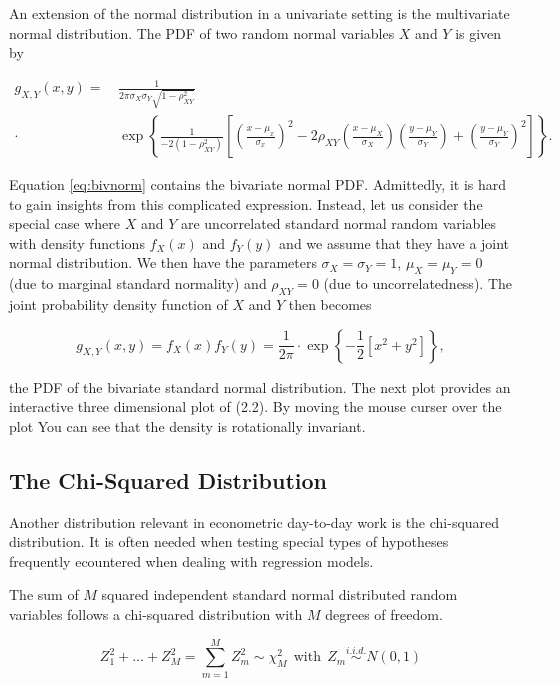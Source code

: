 \documentclass[]{book}
\theoremstyle{definition}
\theoremstyle{definition}
\theoremstyle{definition}
\theoremstyle{remark}
\begin{document}
An extension of the normal distribution in a univariate setting is the
multivariate normal distribution. The PDF of two random normal variables
\(X\) and \(Y\) is given by

\begin{align}
g_{X,Y}(x,y) =& \, \frac{1}{2\pi\sigma_X\sigma_Y\sqrt{1-\rho_{XY}^2}} \\ 
\cdot & \, \exp \left\{ \frac{1}{-2(1-\rho_{XY}^2)} \left[ \left( \frac{x-\mu_x}{\sigma_x} \right)^2 - 2\rho_{XY}\left( \frac{x-\mu_X}{\sigma_X} \right)\left( \frac{y-\mu_Y}{\sigma_Y} \right) + \left( \frac{y-\mu_Y}{\sigma_Y} \right)^2 \right]  \right\}. \label{eq:bivnorm}
\end{align}

Equation \eqref{eq:bivnorm} contains the bivariate normal PDF. Admittedly,
it is hard to gain insights from this complicated expression. Instead,
let us consider the special case where \(X\) and \(Y\) are uncorrelated
standard normal random variables with density functions \(f_X(x)\) and
\(f_Y(y)\) and we assume that they have a joint normal distribution. We
then have the parameters \(\sigma_X = \sigma_Y = 1\), \(\mu_X=\mu_Y=0\)
(due to marginal standard normality) and \(\rho_{XY}=0\) (due to
uncorrelatedness). The joint probability density function of \(X\) and
\(Y\) then becomes

\[ g_{X,Y}(x,y) = f_X(x) f_Y(y) = \frac{1}{2\pi} \cdot \exp \left\{ -\frac{1}{2} \left[x^2 + y^2 \right]  \right\}, \tag{2.2}  \]

the PDF of the bivariate standard normal distribution. The next plot
provides an interactive three dimensional plot of (2.2). By moving the
mouse curser over the plot You can see that the density is rotationally
invariant.

\subsection*{The Chi-Squared
Distribution}\label{the-chi-squared-distribution}

Another distribution relevant in econometric day-to-day work is the
chi-squared distribution. It is often needed when testing special types
of hypotheses frequently ecountered when dealing with regression models.

The sum of \(M\) squared independent standard normal distributed random
variables follows a chi-squared distribution with \(M\) degrees of
freedom.

\[ Z_1^2 + \dots + Z_M^2 = \sum_{m=1}^M Z_m^2 \sim \chi^2_M \ \ \text{with} \ \ Z_m \overset{i.i.d.}{\sim} N(0,1) \label{eq:chisq}\]
\end{document}
